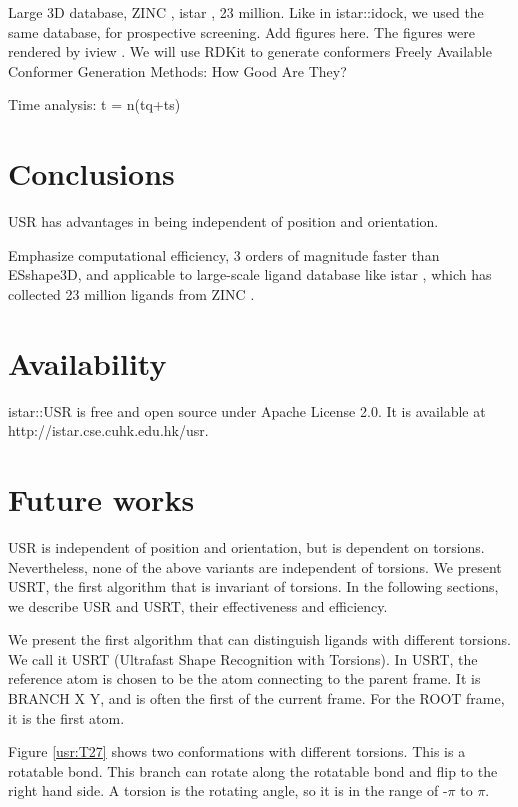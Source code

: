 Large 3D database, ZINC \citep{532,1178}, istar \citep{1362}, 23 million.
Like in istar::idock, we used the same database, for prospective screening.
Add figures here. The figures were rendered by iview \citep{1366}.
We will use RDKit to generate conformers \citep{1127} Freely Available Conformer Generation Methods: How Good Are They?

Time analysis: t = n(tq+ts)

\section{Conclusions}

USR has advantages in being independent of position and orientation.

Emphasize computational efficiency, 3 orders of magnitude faster than ESshape3D, and applicable to large-scale ligand database like istar \citep{1362}, which has collected 23 million ligands from ZINC \citep{532,1178}.

\section{Availability}

istar::USR is free and open source under Apache License 2.0. It is available at http://istar.cse.cuhk.edu.hk/usr.

\section{Future works}

USR is independent of position and orientation, but is dependent on torsions. Nevertheless, none of the above variants are independent of torsions. We present USRT, the first algorithm that is invariant of torsions. In the following sections, we describe USR and USRT, their effectiveness and efficiency.

We present the first algorithm that can distinguish ligands with different torsions. We call it USRT (Ultrafast Shape Recognition with Torsions). In USRT, the reference atom is chosen to be the atom connecting to the parent frame. It is BRANCH X Y, and is often the first of the current frame. For the ROOT frame, it is the first atom.

Figure \ref{usr:T27} shows two conformations with different torsions. This is a rotatable bond. This branch can rotate along the rotatable bond and flip to the right hand side. A torsion is the rotating angle, so it is in the range of -$\pi$ to $\pi$. 

